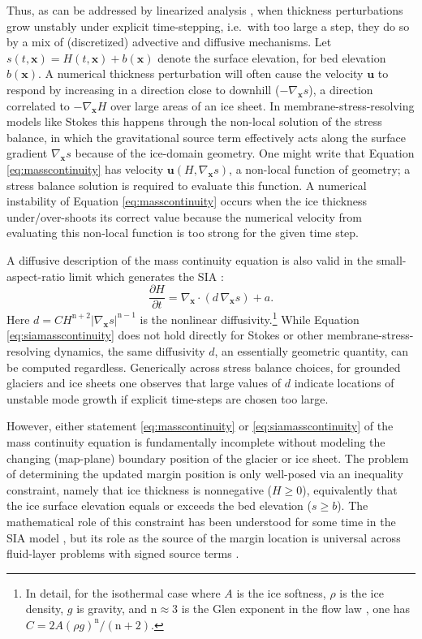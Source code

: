 \documentclass[review,letterpaper]{igs}
\newcommand\bu{\mathbf{u}}
\newcommand\bx{\mathbf{x}}
\newcommand{\Divx}{\nabla_\bx \cdot}
\newcommand{\gradx}{\nabla_\bx}
\begin{document}
Thus, as can be addressed by linearized analysis \citep{Robinsonetal2022}, when thickness perturbations grow unstably under explicit time-stepping, i.e.~with too large a step, they do so by a mix of (discretized) advective and diffusive mechanisms.  Let $s(t,\bx)=H(t,\bx)+b(\bx)$ denote the surface elevation, for bed elevation $b(\bx)$.  A numerical thickness perturbation will often cause the velocity $\bu$ to respond by increasing in a direction close to downhill ($-\gradx s$), a direction correlated to $-\gradx H$ over large areas of an ice sheet.  In membrane-stress-resolving models like Stokes this happens through the non-local solution of the stress balance, in which the gravitational source term effectively acts along the surface gradient $\gradx s$ because of the ice-domain geometry.  One might write that Equation \eqref{eq:masscontinuity} has velocity $\bu(H,\gradx s)$, a non-local function of geometry; a stress balance solution is required to evaluate this function.  A numerical instability of Equation \eqref{eq:masscontinuity} occurs when the ice thickness under/over-shoots its correct value because the numerical velocity from evaluating this non-local function is too strong for the given time step.

\newcommand{\nn}{\text{n}}
A diffusive description of the mass continuity equation is also valid in the small-aspect-ratio limit which generates the SIA \citep{SchoofHewitt2013}:
\begin{equation}
\frac{\partial H}{\partial t} = \Divx \left(d\, \gradx s \right) + a. \label{eq:siamasscontinuity}
\end{equation}
Here $d = C H^{\nn+2} |\gradx s|^{\nn-1}$ is the nonlinear diffusivity.\footnote{In detail, for the isothermal case where $A$ is the ice softness, $\rho$ is the ice density, $g$ is gravity, and $\nn\approx 3$ is the Glen exponent in the flow law \citep{GreveBlatter2009}, one has $C = 2 A (\rho g)^\nn/(\nn+2)$.}  While Equation \eqref{eq:siamasscontinuity} does not hold directly for Stokes or other membrane-stress-resolving dynamics, the same diffusivity $d$, an essentially geometric quantity, can be computed regardless.  Generically across stress balance choices, for grounded glaciers and ice sheets one observes that large values of $d$ indicate locations of unstable mode growth if explicit time-steps are chosen too large.

However, either statement \eqref{eq:masscontinuity} or \eqref{eq:siamasscontinuity} of the mass continuity equation is fundamentally incomplete without modeling the changing (map-plane) boundary position of the glacier or ice sheet.  The problem of determining the updated margin position is only well-posed via an inequality constraint, namely that ice thickness is nonnegative ($H\ge 0$), equivalently that the ice surface elevation equals or exceeds the bed elevation ($s \ge b$).  The mathematical role of this constraint has been understood for some time in the SIA model \citep{Calvoetal2002,JouvetBueler2012,SchoofHewitt2013}, but its role as the source of the margin location is universal across fluid-layer problems with signed source terms \citep{Bueler2021conservation}.
\end{document}
